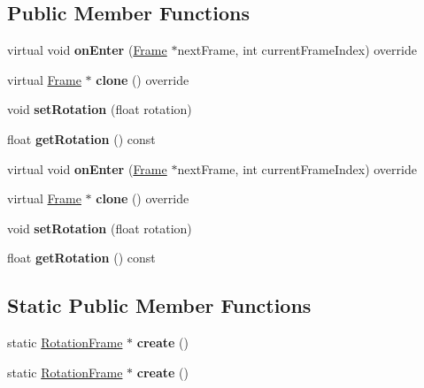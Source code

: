 \subsection*{Public Member Functions}
\begin{DoxyCompactItemize}
\item 
\mbox{\label{classRotationFrame_ae29385797cc983aa54699a442761f38f}} 
virtual void {\bfseries on\+Enter} (\hyperlink{classFrame}{Frame} $\ast$next\+Frame, int current\+Frame\+Index) override
\item 
\mbox{\label{classRotationFrame_abe27b76e022c635a9ab85eb88a1482b5}} 
virtual \hyperlink{classFrame}{Frame} $\ast$ {\bfseries clone} () override
\item 
\mbox{\label{classRotationFrame_a1c33bfbbfc89f6faf185592061367436}} 
void {\bfseries set\+Rotation} (float rotation)
\item 
\mbox{\label{classRotationFrame_ae1faf0a8eb1af434c4a44ed160cb1517}} 
float {\bfseries get\+Rotation} () const
\item 
\mbox{\label{classRotationFrame_aa5bd38befb8861d19d6640b7d648b755}} 
virtual void {\bfseries on\+Enter} (\hyperlink{classFrame}{Frame} $\ast$next\+Frame, int current\+Frame\+Index) override
\item 
\mbox{\label{classRotationFrame_adea78c2746ae863466750d8b59a5925d}} 
virtual \hyperlink{classFrame}{Frame} $\ast$ {\bfseries clone} () override
\item 
\mbox{\label{classRotationFrame_a1c33bfbbfc89f6faf185592061367436}} 
void {\bfseries set\+Rotation} (float rotation)
\item 
\mbox{\label{classRotationFrame_ae1faf0a8eb1af434c4a44ed160cb1517}} 
float {\bfseries get\+Rotation} () const
\end{DoxyCompactItemize}
\subsection*{Static Public Member Functions}
\begin{DoxyCompactItemize}
\item 
\mbox{\label{classRotationFrame_a8d14fd5798d2f18a3cb53f2b5412c091}} 
static \hyperlink{classRotationFrame}{Rotation\+Frame} $\ast$ {\bfseries create} ()
\item 
\mbox{\label{classRotationFrame_aef5f61c639c7d5afe2422b5f370ab116}} 
static \hyperlink{classRotationFrame}{Rotation\+Frame} $\ast$ {\bfseries create} ()
\end{DoxyCompactItemize}
